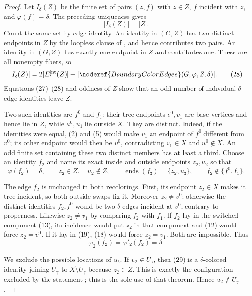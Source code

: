 \begin{proof}
Let $I_\delta(Z)$ be the finite set of pairs $(z,f)$ with $z\in Z$,
$f$ incident with $z$, and $\varphi(f)=\delta$.  The preceding uniqueness
gives
\[
 |I_\delta(Z)|=|Z|.                                         \tag{27}
\]
Count the same set by edge identity.  An identity in
$(G,Z)$ has two distinct endpoints in $Z$ by the
loopless clause of , and hence contributes
two pairs.  An identity in $(G,Z)$ has exactly one
endpoint in $Z$ and contributes one.  These are all nonempty fibers, so
\[
 |I_\delta(Z)|=
 2|E^{\rm int}_\delta(Z)|+
 |\noderef{BoundaryColorEdges}(G,\varphi,Z,\delta)|.          \tag{28}
\]
Equations (27)--(28) and oddness of $Z$ show that an odd number of
individual $\delta$-edge identities leave $Z$.

Two such identities are $f^0$ and $f_1$: their tree endpoints $v^0,v_1$
are base vertices and hence lie in $Z$, while $u^0,u_1$ lie outside $X$.
They are distinct.  Indeed, if the identities were equal, (2) and (5)
would make $v_1$ an endpoint of $f^0$ different from $v^0$; its other
endpoint would then be $u^0$, contradicting $v_1\in X$ and
$u^0\notin X$.  An odd finite set containing these two distinct members
has at least a third.  Choose an identity $f_2$ and name its exact inside
and outside endpoints $z_2,u_2$ so that
\[
 \varphi(f_2)=\delta,\qquad
 z_2\in Z,\quad u_2\notin Z,\qquad
 \operatorname{ends}(f_2)=\{z_2,u_2\},\qquad
 f_2\notin\{f^0,f_1\}.                                     \tag{29}
\]

The edge $f_2$ is unchanged in both recolorings.  First, its endpoint
$z_2\in X$ makes it tree-incident, so both outside swaps fix it.  Moreover
$z_2\ne v^0$: otherwise the distinct identities $f_2,f^0$ would be two
$\delta$-edges incident at $v^0$, contrary to properness.  Likewise
$z_2\ne v_1$ by comparing $f_2$ with $f_1$.  If $f_2$ lay in the switched
component (13), its incidence would put $z_2$ in that component and (12)
would force $z_2=v^0$.  If it lay in (19), (18) would force
$z_2=v_1$.  Both are impossible.  Thus
\[
 \varphi_2(f_2)=\varphi'_2(f_2)=\delta.                      \tag{30}
\]

We exclude the possible locations of $u_2$.  If
$u_2\in U_\gamma$, then (29) is a $\delta$-colored identity joining
$U_\gamma$ to $X\setminus U_\gamma$ because $z_2\in Z$.  This is exactly
the configuration excluded by the statement
; this is the sole use of that theorem.
Hence $u_2\notin U_\gamma$.


\end{proof}
